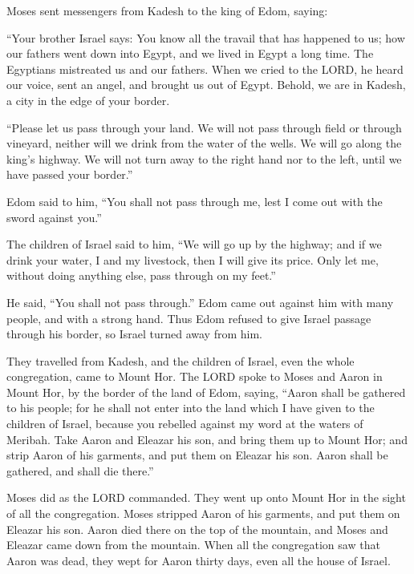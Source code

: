  Moses sent messengers from Kadesh to the king of Edom,
saying:

``Your brother Israel says: You know all the travail that has happened
to us;  how our fathers went down into Egypt, and we
lived in Egypt a long time. The Egyptians mistreated us and our fathers.
 When we cried to the LORD, he heard our voice, sent an
angel, and brought us out of Egypt. Behold, we are in Kadesh, a city in
the edge of your border.

 ``Please let us pass through your land. We will not pass
through field or through vineyard, neither will we drink from the water
of the wells. We will go along the king's highway. We will not turn away
to the right hand nor to the left, until we have passed your border.''

 Edom said to him, ``You shall not pass through me, lest
I come out with the sword against you.''

 The children of Israel said to him, ``We will go up by
the highway; and if we drink your water, I and my livestock, then I will
give its price. Only let me, without doing anything else, pass through
on my feet.''

 He said, ``You shall not pass through.'' Edom came out
against him with many people, and with a strong hand. 
Thus Edom refused to give Israel passage through his border, so Israel
turned away from him.

 They travelled from Kadesh, and the children of Israel,
even the whole congregation, came to Mount Hor.  The LORD
spoke to Moses and Aaron in Mount Hor, by the border of the land of
Edom, saying,  ``Aaron shall be gathered to his people;
for he shall not enter into the land which I have given to the children
of Israel, because you rebelled against my word at the waters of
Meribah.  Take Aaron and Eleazar his son, and bring them
up to Mount Hor;  and strip Aaron of his garments, and
put them on Eleazar his son. Aaron shall be gathered, and shall die
there.''

 Moses did as the LORD commanded. They went up onto Mount
Hor in the sight of all the congregation.  Moses stripped
Aaron of his garments, and put them on Eleazar his son. Aaron died there
on the top of the mountain, and Moses and Eleazar came down from the
mountain.  When all the congregation saw that Aaron was
dead, they wept for Aaron thirty days, even all the house of Israel.

